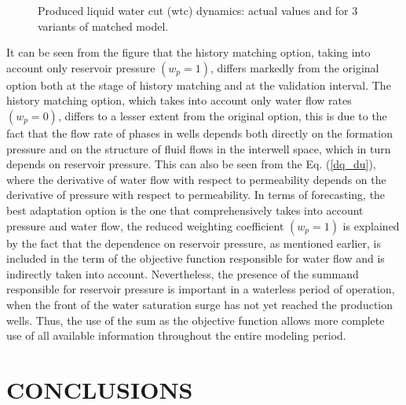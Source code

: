 \documentclass[
11pt,%
tightenlines,%
twoside,%
onecolumn,%
nofloats,%
nobibnotes,%
nofootinbib,%
superscriptaddress,%
noshowpacs,%
centertags]%
{revtex4}
\begin{document}
\begin{figure}
\caption{Produced liquid water cut (wtc) dynamics: actual values and
for 3 variants of matched model.}
    \label{fig:wtc}
\end{figure}
It can be seen from the figure that the history matching option,
taking into account only reservoir pressure $(w_p=1)$, differs
markedly from the original option both at the stage of history
matching and at the validation interval. The history matching
option, which takes into account only water flow rates $(w_p=0)$,
differs to a lesser extent from the original option, this is due to
the fact that the flow rate of phases in wells depends both directly
on the formation pressure and on the structure of fluid flows
in the interwell space, which in turn depends on reservoir pressure.
This can also be seen from the Eq. (\ref{dq_du}), where the derivative of water flow with respect to permeability depends on the derivative of pressure with respect to permeability. In terms of forecasting, the best adaptation
option is the one that comprehensively takes into account pressure and water flow, the reduced
weighting coefficient $(w_p=1)$ is explained by the fact that the
dependence on reservoir pressure, as mentioned earlier, is included
in the term of the objective function responsible for water flow and
is indirectly taken into account. Nevertheless, the presence of the 
summand responsible for reservoir pressure is important in a waterless
period of operation, when the front of the water saturation surge has
not yet reached the production wells. Thus, the use of the sum as
the objective function allows more complete use of all available
information throughout the entire modeling period.

\section{CONCLUSIONS}
\end{document}
